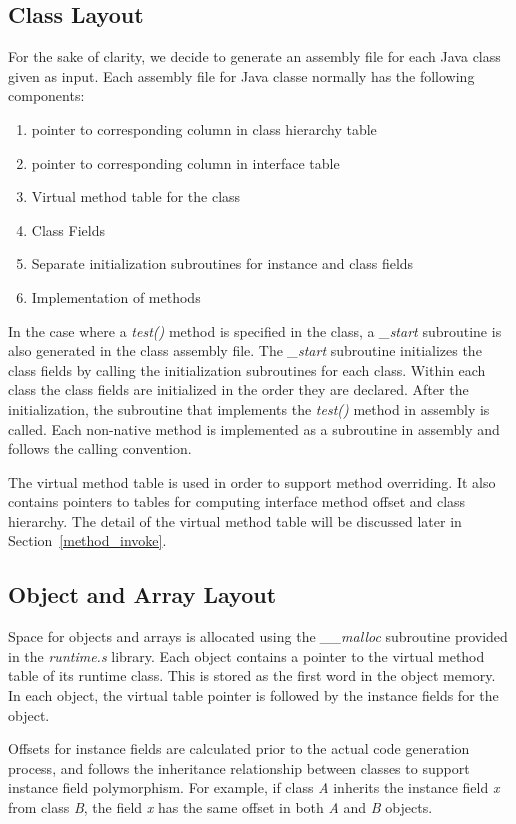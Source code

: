 \documentclass[a4paper, notitlepage]{report}
\begin{document}
\subsection{Class Layout}
\label{class_layout}
For the sake of clarity, we decide to generate an assembly file for each Java class given as input. Each assembly file for Java classe normally has the following components:
\begin{enumerate}
\item pointer to corresponding column in class hierarchy table
\item pointer to corresponding column in interface table
\item Virtual method table for the class
\item Class Fields
\item Separate initialization subroutines for instance and class fields
\item Implementation of methods
\end{enumerate}

In the case where a \emph{test()} method is specified in the class, a \emph{\_start} subroutine is also generated in the class assembly file. The \emph{\_start} subroutine initializes the class fields by calling the initialization subroutines for each class. Within each class the class fields are initialized in the order they are declared. After the initialization, the subroutine that implements the \emph{test()} method in assembly is called. Each non-native method is implemented as a subroutine in assembly and follows the calling convention.

The virtual method table is used in order to support method overriding. It also contains pointers to tables for computing interface method offset and class hierarchy. The detail of the virtual method table will be discussed later in Section~\ref{method_invoke}. 


\subsection{Object and Array Layout}
\label{object_layout}
Space for objects and arrays is allocated using the \emph{\_\_malloc} subroutine provided in the \emph{runtime.s} library. Each object contains a pointer to the virtual method table of its runtime class. This is stored as the first word in the object memory. In each object, the virtual table pointer is followed by the instance fields for the object.

Offsets for instance fields are calculated prior to the actual code generation process, and follows the inheritance relationship between classes to support instance field polymorphism. For example, if class \emph{A} inherits the instance field \emph{x} from class \emph{B}, the field \emph{x} has the same offset in both \emph{A} and \emph{B} objects.
\end{document}
